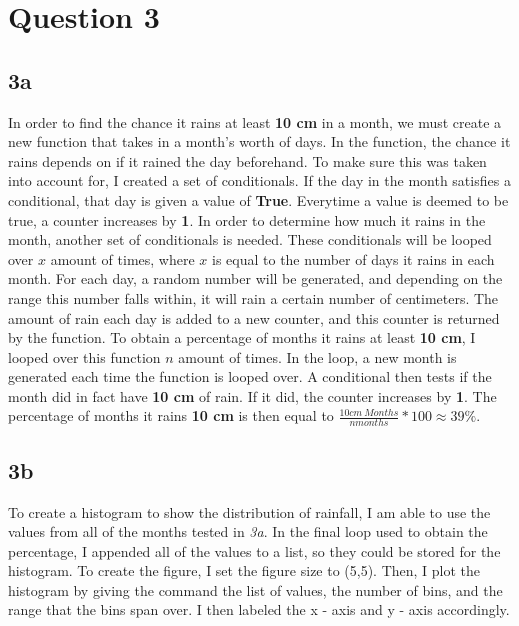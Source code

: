\documentclass[twocolumn]{revtex4}
\begin{document}
\section{Question 3}



\subsection{3a} 

In order to find the chance it rains at least \textbf{10 cm} in a month, we must create a new function that takes in a month's worth of days.   In the function, the chance it rains depends on if it rained the day beforehand.  To make sure this was taken into account for, I created a set of conditionals.  If the day in the month satisfies a conditional, that day is given a value of \textbf{True}.  Everytime a value is deemed to be true, a counter increases by \textbf{1}.  In order to determine how much it rains in the month, another set of conditionals is needed.  These conditionals will be looped over $x$ amount of times, where $x$ is equal to the number of days it rains in each month.  For each day, a random number will be generated, and depending on the range this number falls within, it will rain a certain number of centimeters.  The amount of rain each day is added to a new counter, and this counter is returned by the function.  To obtain a percentage of months it rains at least \textbf{10 cm}, I looped over this function $n$ amount of times.  In the loop, a new month is generated each time the function is looped over.  A conditional then tests if the month did in fact have \textbf{10 cm} of rain.  If it did, the counter increases by \textbf{1}.  The percentage of months it rains \textbf{10 cm} is then equal to $ \frac{10cm~Months}{nmonths} * 100 \approx 39 \% $.

\subsection{3b}

To create a histogram to show the distribution of rainfall, I am able to use the values from all of the months tested in \textit{3a}.  In the final loop used to obtain the percentage, I appended all of the values to a list, so they could be stored for the histogram.   To create the figure, I set the figure size to (5,5).  Then, I plot the histogram by giving the command the list of values, the number of bins, and the range that the bins span over.  I then labeled the x - axis and y - axis accordingly.
\end{document}
